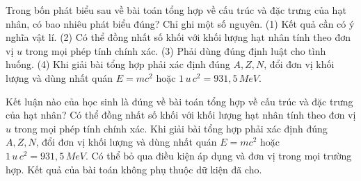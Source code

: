 \begin{ex}
Trong bốn phát biểu sau về bài toán tổng hợp về cấu trúc và đặc trưng của hạt nhân, có bao nhiêu phát biểu đúng? Chỉ ghi một số nguyên. (1) Kết quả cần có ý nghĩa vật lí. (2) Có thể đồng nhất số khối với khối lượng hạt nhân tính theo đơn vị $u$ trong mọi phép tính chính xác. (3) Phải dùng đúng định luật cho tình huống. (4) Khi giải bài tổng hợp phải xác định đúng $A,Z,N$, đổi đơn vị khối lượng và dùng nhất quán $E=mc^2$ hoặc $1\,u\,c^2=931,5\,MeV$.
\end{ex}

\begin{ex}
Kết luận nào của học sinh là đúng về bài toán tổng hợp về cấu trúc và đặc trưng của hạt nhân?
\choice
{Có thể đồng nhất số khối với khối lượng hạt nhân tính theo đơn vị $u$ trong mọi phép tính chính xác.}
{\True Khi giải bài tổng hợp phải xác định đúng $A,Z,N$, đổi đơn vị khối lượng và dùng nhất quán $E=mc^2$ hoặc $1\,u\,c^2=931,5\,MeV$.}
{Có thể bỏ qua điều kiện áp dụng và đơn vị trong mọi trường hợp.}
{Kết quả của bài toán không phụ thuộc dữ kiện đã cho.}
\end{ex}


